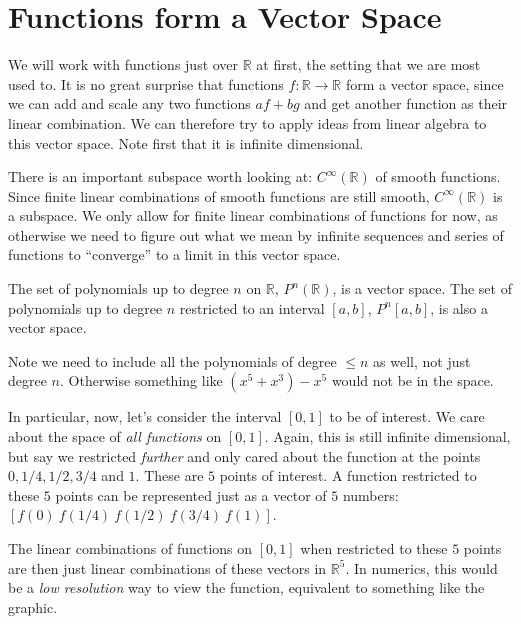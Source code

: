 \section{Functions form a Vector Space} %
\label{sec:functions_form_a_vector_space}

	We will work with functions just over $\mathbb R$ at first, the setting that we are most used to. It is no great surprise that functions $f:\mathbb{R} \rightarrow \mathbb R$ form a vector space, since we can add and scale any two functions $a f + b g$ and get another function as their linear combination. We can therefore try to apply ideas from linear algebra to this vector space. Note first that it is infinite dimensional. 
	
	There is an important subspace worth looking at: $C^{\infty} (\mathbb R)$ of smooth functions. Since finite linear combinations of smooth functions are still smooth, $C^{\infty} (\mathbb R)$ is a subspace. We only allow for finite linear combinations of functions for now, as otherwise we need to figure out what we mean by infinite sequences and series of functions to ``converge'' to a limit in this vector space. 
	
	\begin{example}
		The set of polynomials up to degree $n$ on $\mathbb{R}$, $P^n(\mathbb R)$, is a vector space. The set of polynomials up to degree $n$ restricted to an interval $[a,b]$, $P^n[a,b]$, is also a vector space. 
	\end{example}
	Note we need to include all the polynomials of degree $\leq n$ as well, not just degree $n$. Otherwise something like $(x^{5} + x^{3}) - x^{5}$ would not be in the space. 
	
	In particular, now, let's consider the interval $[0,1]$ to be of interest. We care about the space of \emph{all functions} on $[0,1]$. Again, this is still infinite dimensional, but say we restricted \emph{further} and only cared about the function at the points $0, 1/4, 1/2, 3/4$ and $1$. These are $5$ points of interest. A function restricted to these $5$ points can be represented just as a vector of $5$ numbers: $[f(0) ~ f(1/4) ~ f(1/2) ~ f(3/4) ~ f(1)]$.
	
	The linear combinations of functions on $[0,1]$ when restricted to these $5$ points are then just linear combinations of these vectors in $\mathbb{R}^5$. In numerics, this would be a \emph{low resolution} way to view the function, equivalent to something like the graphic.

	
